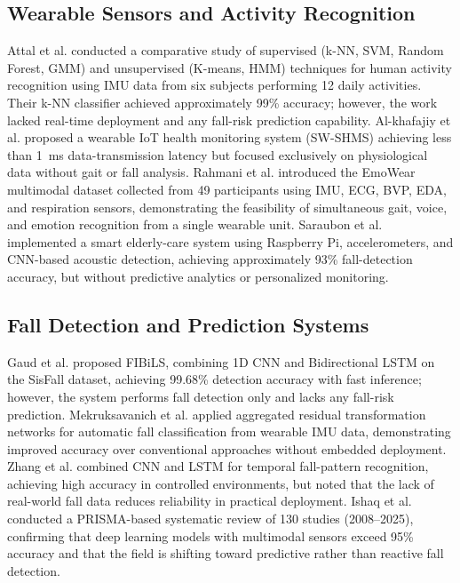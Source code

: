 \documentclass[conference]{IEEEtran}
\begin{document}
\subsection{Wearable Sensors and Activity Recognition}

Attal et al. \cite{b3} conducted a comparative study of supervised (k-NN, SVM, Random Forest, GMM) and unsupervised (K-means, HMM) techniques for human activity recognition using IMU data from six subjects performing 12 daily activities. Their k-NN classifier achieved approximately 99\% accuracy; however, the work lacked real-time deployment and any fall-risk prediction capability. Al-khafajiy et al. \cite{b11} proposed a wearable IoT health monitoring system (SW-SHMS) achieving less than 1~ms data-transmission latency but focused exclusively on physiological data without gait or fall analysis. Rahmani et al. \cite{b12} introduced the EmoWear multimodal dataset collected from 49 participants using IMU, ECG, BVP, EDA, and respiration sensors, demonstrating the feasibility of simultaneous gait, voice, and emotion recognition from a single wearable unit. Saraubon et al. \cite{b25} implemented a smart elderly-care system using Raspberry Pi, accelerometers, and CNN-based acoustic detection, achieving approximately 93\% fall-detection accuracy, but without predictive analytics or personalized monitoring.

\subsection{Fall Detection and Prediction Systems}

Gaud et al. \cite{b13} proposed FIBiLS, combining 1D CNN and Bidirectional LSTM on the SisFall dataset, achieving 99.68\% detection accuracy with fast inference; however, the system performs fall detection only and lacks any fall-risk prediction. Mekruksavanich et al. \cite{b14} applied aggregated residual transformation networks for automatic fall classification from wearable IMU data, demonstrating improved accuracy over conventional approaches without embedded deployment. Zhang et al. \cite{b5} combined CNN and LSTM for temporal fall-pattern recognition, achieving high accuracy in controlled environments, but noted that the lack of real-world fall data reduces reliability in practical deployment. Ishaq et al. \cite{b2} conducted a PRISMA-based systematic review of 130 studies (2008--2025), confirming that deep learning models with multimodal sensors exceed 95\% accuracy and that the field is shifting toward predictive rather than reactive fall detection.
\end{document}
